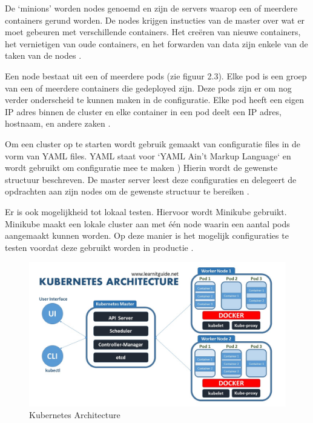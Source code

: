 De `minions' worden nodes genoemd en zijn de servers waarop een of meerdere containers gerund worden. De nodes krijgen instucties van de master over wat er moet gebeuren met verschillende containers. Het creëren van nieuwe containers, het vernietigen van oude containers, en het forwarden van data zijn enkele van de taken van de nodes \autocite{ellingwood2018}.

Een node bestaat uit een of meerdere pods (zie figuur 2.3). Elke pod is een groep van een of meerdere containers die gedeployed zijn. Deze pods zijn er om nog verder onderscheid te kunnen maken in de configuratie. Elke pod heeft een eigen IP adres binnen de cluster en elke container in een pod deelt een IP adres, hostnaam, en andere zaken \autocite{learnitguide2018}.

Om een cluster op te starten wordt gebruik gemaakt van configuratie files in de vorm van YAML files. YAML staat voor `YAML Ain't Markup Language` en wordt gebruikt om configuratie mee te maken \autocite{grav}) Hierin wordt de gewenste structuur beschreven. De master server leest deze configuraties en delegeert de opdrachten aan zijn nodes om de gewenste structuur te bereiken \autocite{ellingwood2018}.

Er is ook mogelijkheid tot lokaal testen. Hiervoor wordt Minikube gebruikt. Minikube maakt een lokale cluster aan met één node waarin een aantal pods aangemaakt kunnen worden. Op deze manier is het mogelijk configuraties te testen voordat deze gebruikt worden in productie \autocite{ellingwood2018}.

\begin{figure}[ht]
    \centering
   \includegraphics[scale=0.4]{img/kubernetes_architecture_explained}
    \caption[Kubernetes Architecture]{Kubernetes Architecture \cite{learnitguide2018}}
\end{figure}

